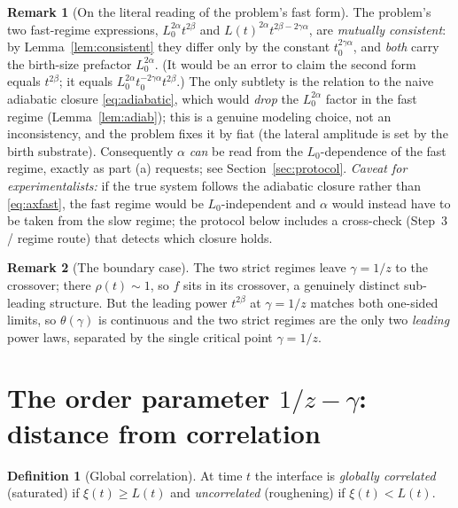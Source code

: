 \documentclass{amsart}
\theoremstyle{definition}
\newtheorem{definition}{Definition}
\newtheorem{remark}{Remark}
\newcommand{\asymp}{\sim}
\begin{document}
\begin{remark}[On the literal reading of the problem's fast form]\label{rem:correction}
The problem's two fast-regime expressions,
$L_0^{2\alpha}t^{2\beta}$ and $L(t)^{2\alpha}t^{2\beta-2\gamma\alpha}$, are
\emph{mutually consistent}: by Lemma~\ref{lem:consistent} they differ only by the
constant $t_0^{2\gamma\alpha}$, and \emph{both} carry the birth-size prefactor
$L_0^{2\alpha}$. (It would be an error to claim the second form equals $t^{2\beta}$;
it equals $L_0^{2\alpha}t_0^{-2\gamma\alpha}t^{2\beta}$.) The only subtlety is the
relation to the naive adiabatic closure \eqref{eq:adiabatic}, which would
\emph{drop} the $L_0^{2\alpha}$ factor in the fast regime (Lemma~\ref{lem:adiab});
this is a genuine modeling choice, not an inconsistency, and the problem fixes it by
fiat (the lateral amplitude is set by the birth substrate). Consequently $\alpha$
\emph{can} be read from the $L_0$-dependence of the fast regime, exactly as part (a)
requests; see Section~\ref{sec:protocol}. \emph{Caveat for experimentalists:} if the
true system follows the adiabatic closure rather than \eqref{eq:axfast}, the fast
regime would be $L_0$-independent and $\alpha$ would instead have to be taken from
the slow regime; the protocol below includes a cross-check (Step~3 / regime route)
that detects which closure holds.
\end{remark}

\begin{remark}[The boundary case]
The two strict regimes leave $\gamma=1/z$ to the crossover; there $\rho(t)\asymp1$,
so $f$ sits in its crossover, a genuinely distinct sub-leading structure. But the
leading power $t^{2\beta}$ at $\gamma=1/z$ matches both one-sided limits, so
$\theta(\gamma)$ is continuous and the two strict regimes are the only two
\emph{leading} power laws, separated by the single critical point $\gamma=1/z$.
\end{remark}

\section{The order parameter $1/z-\gamma$: distance from correlation}
\label{sec:correlation}

\begin{definition}[Global correlation]\label{def:corr}
At time $t$ the interface is \emph{globally correlated} (saturated) if
$\xi(t)\ge L(t)$ and \emph{uncorrelated} (roughening) if $\xi(t)<L(t)$.
\end{definition}
\end{document}
